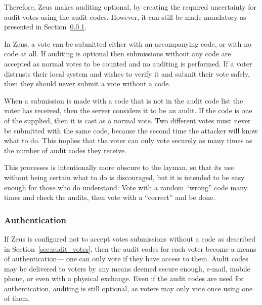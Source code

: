 \documentclass[letterpaper,10pt]{article}
\begin{document}
Therefore, Zeus makes auditing optional, by creating the required
uncertainty for audit votes using the audit codes.
However, it can still be made mandatory as presented in
Section~\ref{sec:authentication}.

In Zeus, a vote can be submitted either with an accompanying code,
or with no code at all.
If auditing is optional then submissions without any code are accepted
as normal votes to be counted and no auditing is performed.
If a voter distrusts their local system and wishes to verify it
and submit their vote safely, then they should never submit
a vote without a code.

When a submission is made with a code that is not in the audit code list
the voter has received, then the server considers it to be an audit.
If the code is one of the supplied, then it is cast as a normal vote.
Two different votes must never be submitted with the same code,
because the second time the attacker will know what to do.
This implies that the voter can only vote securely as many times as
the number of audit codes they receive.

This processes is intentionally more obscure to the layman,
so that its use without being certain what to do is discouraged,
but it is intended to be easy enough for those who do understand:
Vote with a random ``wrong'' code many times and check the audits,
then vote with a ``correct'' and be done.

\subsubsection{Authentication}
\label{sec:authentication}
If Zeus is configured not to accept votes submissions without a code
as described in Section~\ref{sec:audit_votes},
then the audit codes for each voter become a means of authentication---
one can only vote if they have access to them.
Audit codes may be delivered to voters by any means deemed secure enough,
e-mail, mobile phone, or even with a physical exchange.
Even if the audit codes are used for authentication, auditing is still
optional, as voters may only vote once using one of them.


\end{document}

